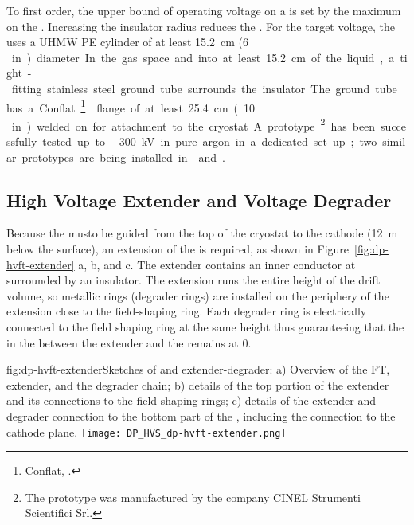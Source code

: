 To first order, the upper bound of operating voltage on a \fdth is set by the maximum \efield on the \fdth.  Increasing the insulator radius reduces the \efield.  For the target voltage, the \fdth uses a UHMW PE cylinder of at least \SI{15.2}{\cm} (\SI{6}\,in) diameter.  In the gas space and into at least \SI{15.2}{\cm} of the liquid, a tight-fitting stainless steel ground tube surrounds the insulator.  The ground tube has a Conflat~\footnote{Conflat\texttrademark{}, \url{}.} 
flange of at least \SI{25.4}{\cm} (\SI{10}\,in) welded on for attachment to the cryostat.  A prototype\footnote{The prototype was manufactured by the company CINEL\texttrademark{} Strumenti Scientifici Srl.}  has been successfully tested up to \SI{-300}{\kV} in pure argon in a dedicated set up; two similar prototypes are being installed in  and .


\subsection{High Voltage Extender and Voltage Degrader}

Because the  musto be guided from the top of the cryostat to the cathode (\SI{12}{\m} below the  surface), an extension of the  \fdth is required, as shown in Figure~\ref{fig:dp-hvft-extender} a, b, and c. The extender contains an inner conductor at \dptargetdriftvoltneg surrounded by an insulator. The extension runs the entire height of the drift volume, so metallic rings (degrader rings) are installed on the periphery of the extension close to the field-shaping ring. Each degrader ring is electrically connected to the field shaping ring at the same height thus guaranteeing that the \efield in the \lar between the extender and the  remains at 0.


\begin{dunefigure}{fig:dp-hvft-extender}{Sketches of  \fdth and  extender-degrader: a) Overview of the  FT,  extender, and the degrader chain; b) details of the top portion of the  extender and its connections to the field shaping rings; c) details of the  extender and degrader connection to the bottom part of the , including the connection to the cathode plane.}
\texttt{[image: DP\_HVS\_dp-hvft-extender.png]}
\end{dunefigure}

